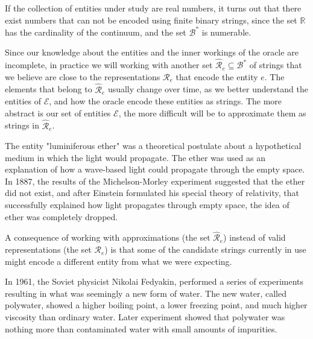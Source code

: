 \begin{example}
If the collection of entities under study are real numbers, it turns out that there exist numbers that can not be encoded using finite binary strings, since the set $\mathbb{R}$ has the cardinality of the continuum, and the set $\mathcal{B}^\ast$ is numerable.
\end{example}

Since our knowledge about the entities and the inner workings of the oracle are incomplete, in practice we will working with another set $\hat{\mathcal{R}}_e \subseteq \mathcal{B}^\ast$ of strings that we believe are close to the representations $\mathcal{R}_e$ that encode the entity $e$. The elements that belong to $\hat{\mathcal{R}}_e$ usually change over time, as we better understand the entities of $\mathcal{E}$, and how the oracle encode these entities as strings. The more abstract is our set of entities $\mathcal{E}$, the more difficult will be to approximate them as strings in $\hat{\mathcal{R}}_e$.

\begin{example}
\label{ex:luminiferous_ether}
The entity "luminiferous ether" was a theoretical postulate about a hypothetical medium in which the light would propagate. The ether was used as an explanation of how a wave-based light could propagate through the empty space. In 1887, the results of the Michelson-Morley experiment suggested that the ether did not exist, and after Einstein formulated his special theory of relativity, that successfully explained how light propagates through empty space, the idea of ether was completely dropped.
\end{example}

A consequence of working with approximations (the set $\hat{\mathcal{R}}_e$) instead of valid representations (the set $\mathcal{R}_e$) is that some of the candidate strings currently in use might encode a different entity from what we were expecting.

\begin{example}
\label{ex:polywater}
In 1961, the Soviet physicist Nikolai Fedyakin, performed a series of experiments resulting in what was seemingly a new form of water. The new water, called polywater, showed a higher boiling point, a lower freezing point, and much higher viscosity than ordinary water. Later experiment showed that polywater was nothing more than contaminated water with small amounts of impurities.
\end{example}

